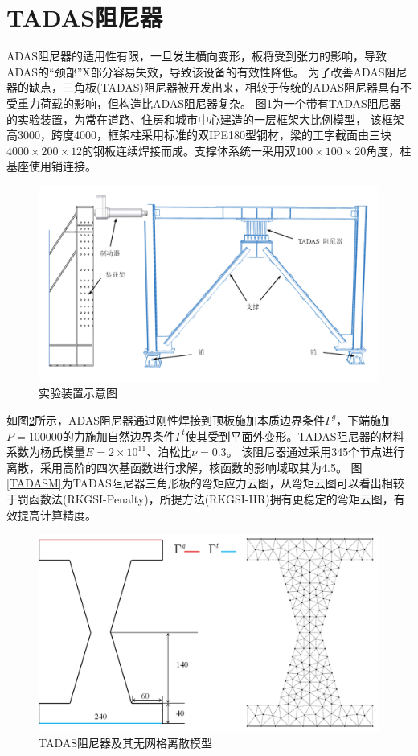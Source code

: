 \section{TADAS阻尼器}
ADAS阻尼器的适用性有限，一旦发生横向变形，板将受到张力的影响，导致ADAS的“颈部”X部分容易失效，导致该设备的有效性降低。
为了改善ADAS阻尼器的缺点，三角板(TADAS)阻尼器被开发出来，相较于传统的ADAS阻尼器具有不受重力荷载的影响，但构造比ADAS阻尼器复杂。
图\ref{TADAS1}为一个带有TADAS阻尼器的实验装置\cite{mohammadi2017}，为常在道路、住房和城市中心建造的一层框架大比例模型，
该框架高3000，跨度4000，框架柱采用标准的双IPE180型钢材，梁的工字截面由三块$4000\times200\times12$的钢板连续焊接而成。支撑体系统一采用双$100\times100\times20$角度，柱基座使用销连接。
\begin{figure}[H]
    \centering
    \includegraphics[scale=0.4]{figure/DAMPER/TADAS/1.png}
    \caption{实验装置示意图\cite{mohammadi2017}}\label{TADAS1}
\end{figure}
如图\ref{TADASmsh}所示，ADAS阻尼器通过刚性焊接到顶板施加本质边界条件$\Gamma^g$，下端施加$P=100000$的力施加自然边界条件$\Gamma^t$使其受到平面外变形。TADAS阻尼器的材料系数为杨氏模量$E=2\times 10^{11}$、泊松比$\nu=0.3$。
该阻尼器通过采用345个节点进行离散，采用高阶的四次基函数进行求解，核函数的影响域取其为4.5。
图\ref{TADASM}为TADAS阻尼器三角形板的弯矩应力云图，从弯矩云图可以看出相较于罚函数法(RKGSI-Penalty)，所提方法(RKGSI-HR)拥有更稳定的弯矩云图，有效提高计算精度。
\begin{figure}[H]
    \centering
    \includegraphics[scale=0.5]{figure/DAMPER/TADAS/TADAS dampers_msh.png}
    \caption{TADAS阻尼器及其无网格离散模型}\label{TADASmsh}
\end{figure}
